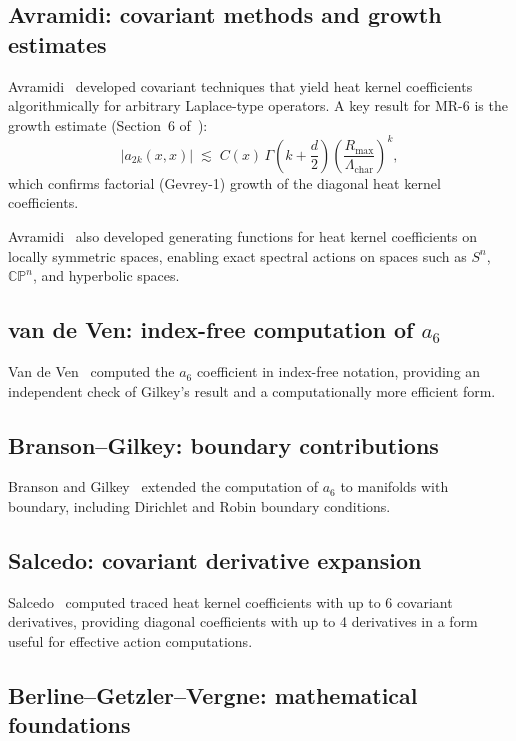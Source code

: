 \documentclass[11pt,a4paper]{article}
\newcommand{\Lam}{\Lambda}
\begin{document}
\subsection{Avramidi: covariant methods and growth estimates}

Avramidi~\cite{A00,A97} developed covariant techniques that yield
heat kernel coefficients algorithmically for arbitrary Laplace-type
operators.  A key result for MR-6 is the growth estimate
(Section~6 of~\cite{A00}):
\begin{equation}\label{eq:avramidi-growth}
  |a_{2k}(x,x)| \;\lesssim\; C(x)\,\Gamma\!\left(k + \frac{d}{2}\right)
  \left(\frac{R_{\max}}{\Lam_{\text{char}}}\right)^k,
\end{equation}
which confirms factorial (Gevrey-1) growth of the diagonal heat kernel
coefficients.

Avramidi~\cite{A08} also developed generating functions for heat kernel
coefficients on locally symmetric spaces, enabling exact spectral actions
on spaces such as $S^n$, $\mathbb{CP}^n$, and hyperbolic spaces.

\subsection{van de Ven: index-free computation of \texorpdfstring{$a_6$}{a6}}

Van de Ven~\cite{vdV98} computed the $a_6$ coefficient in index-free
notation, providing an independent check of Gilkey's result and a
computationally more efficient form.

\subsection{Branson--Gilkey: boundary contributions}

Branson and Gilkey~\cite{BG90} extended the computation of $a_6$ to
manifolds with boundary, including Dirichlet and Robin boundary
conditions.

\subsection{Salcedo: covariant derivative expansion}

Salcedo~\cite{S04} computed traced heat kernel coefficients with up to
6 covariant derivatives, providing diagonal coefficients with up to 4
derivatives in a form useful for effective action computations.

\subsection{Berline--Getzler--Vergne: mathematical foundations}
\end{document}
